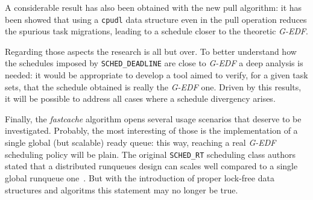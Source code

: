 A considerable result has also been obtained with the new pull algorithm:
it has been showed that using a \texttt{cpudl} data structure even in the
pull operation reduces the spurious task migrations, leading to a schedule
closer to the theoretic \emph{G-EDF}.

Regarding those aspects the research is all but over. To better understand
how the schedules imposed by \texttt{SCHED\_DEADLINE} are close to \emph{G-EDF}
a deep analysis is needed: it would be appropriate to develop a tool aimed
to verify, for a given task sets, that the schedule obtained is really
the \emph{G-EDF} one. Driven by this results, it will be possible to
address all cases where a schedule divergency arises.

Finally, the \emph{fastcache} algorithm opens several usage scenarios that
deserve to be investigated. Probably, the most interesting of those is the
implementation of a single global (but scalable) ready queue: this way,
reaching a real \emph{G-EDF} scheduling policy will be plain. 
The original \texttt{SCHED\_RT} scheduling class authors stated that a distributed
runqueues design can scales well compared to a single global runqueue 
one~\cite{molnar07}.
But with the introduction of proper lock-free data structures and algoritms
this statement may no longer be true.
